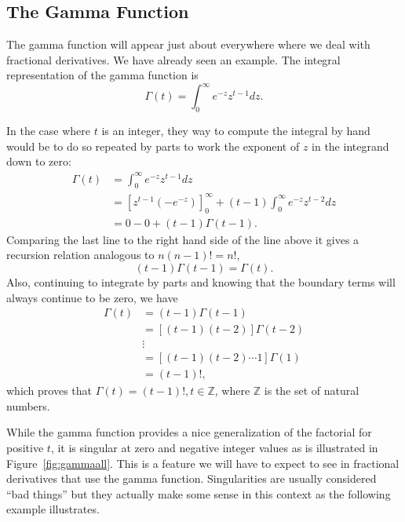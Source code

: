 \subsection{The Gamma Function}
The gamma function will appear just about everywhere where we deal with fractional derivatives. We have already seen an example. The integral representation of the gamma function is
\begin{equation}
  \boxed{ \Gamma(t) = \int_0^\infty e^{-z} z^{t-1} dz. }
  \label{eq:gammadef}
\end{equation}

In the case where $t$ is an integer, they way to compute the integral by hand would be to do so repeated by parts to work the exponent of $z$ in the integrand down to zero:
\begin{align*}
 \Gamma(t) &= 
  \int_0^\infty e^{-z} z^{t-1} dz \\ &= \left[ z^{t-1} \left(- e^{-z} \right) \right]^\infty_0 + \left(t-1 \right) \int_0^\infty e^{-z} z^{t-2} dz \\
&= 0 - 0 + \left( t - 1 \right) \Gamma(t-1).
\end{align*}
Comparing the last line to the right hand side of the line above it gives a recursion relation analogous to $n \left(n - 1 \right)! = n!$, 
\begin{equation}
  \boxed{ \left( t - 1 \right) \Gamma(t - 1) = \Gamma(t). }
  \label{eq:gammarecursion}
\end{equation}
Also, continuing to integrate by parts and knowing that the boundary terms will always continue to be zero, we have
\begin{align*}
  \Gamma(t) &= \left( t - 1 \right) \Gamma \left( t - 1 \right) \\
  &= \left[ \left( t - 1 \right) \left( t - 2 \right) \right] \Gamma \left( t - 2 \right) \\
 & \vdots \\
 &= \left[ \left(t - 1 \right) \left( t - 2 \right) \cdots 1 \right] \Gamma(1) \\
 &= \left( t - 1 \right)!,
\end{align*}
which proves that $\boxed{ \Gamma(t) = (t-1)!, t \in \mathbb Z }$, where $\mathbb Z$ is the set of natural numbers.

While the gamma function provides a nice generalization of the factorial for positive $t$, it is singular at zero and negative integer values as is illustrated in Figure~\ref{fig:gammaall}. This is a feature we will have to expect to see in fractional derivatives that use the gamma function. Singularities are usually considered ``bad things'' but they actually make some sense in this context as the following example illustrates.


